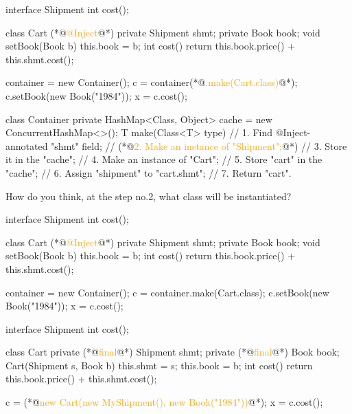 \documentclass{article}
\begin{document}
\begin{pptWide}{2}
{\scriptsize\begin{ffcode}
interface Shipment
  int cost();

class Cart
  (*@\textcolor{orange}{@Inject}@*) private Shipment shmt;
  private Book book;
  void setBook(Book b)
    this.book = b;
  int cost()
    return this.book.price() + this.shmt.cost();

container = new Container();
c = container(*@\textcolor{orange}{.make(Cart.class)}@*);
c.setBook(new Book("1984"));
x = c.cost();
\end{ffcode}
}
\par\columnbreak\par
{\scriptsize\begin{ffcode}
class Container {
  private HashMap<Class, Object> cache =
    new ConcurrentHashMap<>();
  T make(Class<T> type) {
    // 1. Find @Inject-annotated "shmt" field;
    // (*@\textcolor{orange}{2. Make an instance of "Shipment";}@*)
    // 3. Store it in the "cache";
    // 4. Make an instance of "Cart";
    // 5. Store "cart" in the "cache";
    // 6. Assign "shipment" to "cart.shmt";
    // 7. Return "cart".
  }
}
\end{ffcode}
}
How do you think, at the step no.2,
what class will be instantiated?
\end{pptWide}
\par
\plush{}

\begin{pptWide}{2}
{\scriptsize\begin{ffcode}
interface Shipment
  int cost();

class Cart
  (*@\textcolor{orange}{@Inject}@*) private Shipment shmt;
  private Book book;
  void setBook(Book b)
    this.book = b;
  int cost()
    return this.book.price() + this.shmt.cost();

container = new Container();
c = container.make(Cart.class);
c.setBook(new Book("1984"));
x = c.cost();
\end{ffcode}
}
\par\columnbreak\par
{\scriptsize\begin{ffcode}
interface Shipment
  int cost();

class Cart
  private (*@\textcolor{orange}{final}@*) Shipment shmt;
  private (*@\textcolor{orange}{final}@*) Book book;
  Cart(Shipment s, Book b)
    this.shmt = s;
    this.book = b;
  int cost()
    return this.book.price() + this.shmt.cost();

c = (*@\textcolor{orange}{new Cart(new MyShipment(), new Book("1984"))}@*);
x = c.cost();
\end{ffcode}
}
\end{pptWide}
\par
\plush{}
\end{document}
